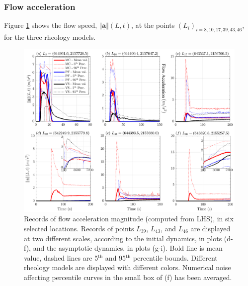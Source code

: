 \documentclass{article}
\begin{document}
\subsubsection{Flow acceleration}
Figure \ref{fig:Colima-Accel1} shows the flow speed, $\Vert \underline{\mathbf{a}} \Vert(L,t)$, at the points $(L_i)_{i=8,10,17,39,43,46}$, for the three rheology models.
\begin{figure}[H]
         \centering
        \includegraphics[width=1\textwidth]{BAF_VolcanDeColima/LocalMeasurments/Acceleration12.png}
        \caption{Records of flow acceleration magnitude (computed from LHS), in six selected locations. Records of points $L_{39}$, $L_{43}$, and $L_{46}$ are displayed at two different scales, according to the initial dynamics, in plots (d-f), and the asymptotic dynamics, in plots (g-i). Bold line is mean value, dashed lines are 5$^{\mathrm{th}}$ and 95$^{\mathrm{th}}$ percentile bounds. Different rheology models are displayed with different colors. Numerical noise affecting percentile curves in the small box of (f) has been averaged.}
        \label{fig:Colima-Accel1}
\end{figure}
\end{document}
